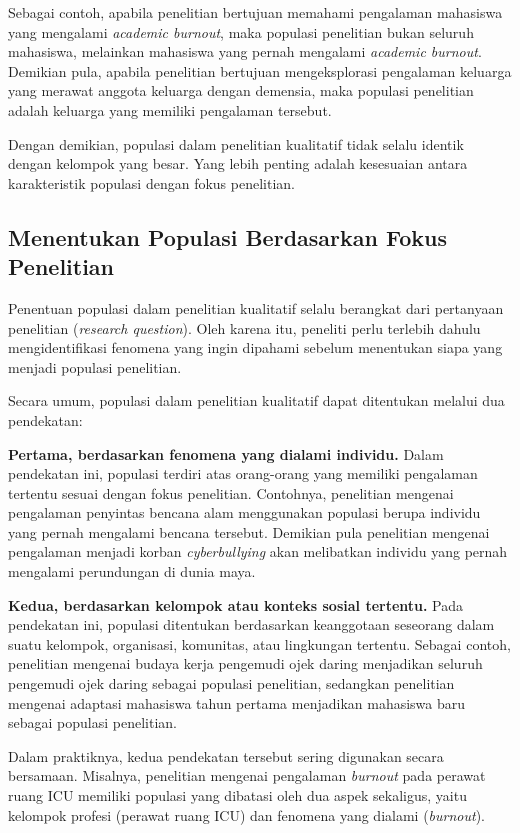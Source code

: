 \documentclass[
  indonesian,
  letterpaper,
  DIV=11,
  numbers=noendperiod]{scrreprt}
\begin{document}
Sebagai contoh, apabila penelitian bertujuan memahami pengalaman
mahasiswa yang mengalami \emph{academic burnout}, maka populasi
penelitian bukan seluruh mahasiswa, melainkan mahasiswa yang pernah
mengalami \emph{academic burnout}. Demikian pula, apabila penelitian
bertujuan mengeksplorasi pengalaman keluarga yang merawat anggota
keluarga dengan demensia, maka populasi penelitian adalah keluarga yang
memiliki pengalaman tersebut.

Dengan demikian, populasi dalam penelitian kualitatif tidak selalu
identik dengan kelompok yang besar. Yang lebih penting adalah kesesuaian
antara karakteristik populasi dengan fokus penelitian.

\subsection{Menentukan Populasi Berdasarkan Fokus
Penelitian}\label{menentukan-populasi-berdasarkan-fokus-penelitian}

Penentuan populasi dalam penelitian kualitatif selalu berangkat dari
pertanyaan penelitian (\emph{research question}). Oleh karena itu,
peneliti perlu terlebih dahulu mengidentifikasi fenomena yang ingin
dipahami sebelum menentukan siapa yang menjadi populasi penelitian.

Secara umum, populasi dalam penelitian kualitatif dapat ditentukan
melalui dua pendekatan:

\textbf{Pertama, berdasarkan fenomena yang dialami individu.} Dalam
pendekatan ini, populasi terdiri atas orang-orang yang memiliki
pengalaman tertentu sesuai dengan fokus penelitian. Contohnya,
penelitian mengenai pengalaman penyintas bencana alam menggunakan
populasi berupa individu yang pernah mengalami bencana tersebut.
Demikian pula penelitian mengenai pengalaman menjadi korban
\emph{cyberbullying} akan melibatkan individu yang pernah mengalami
perundungan di dunia maya.

\textbf{Kedua, berdasarkan kelompok atau konteks sosial tertentu.} Pada
pendekatan ini, populasi ditentukan berdasarkan keanggotaan seseorang
dalam suatu kelompok, organisasi, komunitas, atau lingkungan tertentu.
Sebagai contoh, penelitian mengenai budaya kerja pengemudi ojek daring
menjadikan seluruh pengemudi ojek daring sebagai populasi penelitian,
sedangkan penelitian mengenai adaptasi mahasiswa tahun pertama
menjadikan mahasiswa baru sebagai populasi penelitian.

Dalam praktiknya, kedua pendekatan tersebut sering digunakan secara
bersamaan. Misalnya, penelitian mengenai pengalaman \emph{burnout} pada
perawat ruang ICU memiliki populasi yang dibatasi oleh dua aspek
sekaligus, yaitu kelompok profesi (perawat ruang ICU) dan fenomena yang
dialami (\emph{burnout}).
\end{document}
